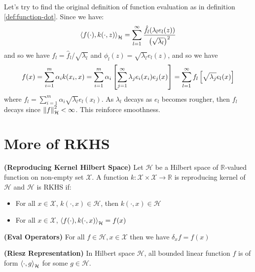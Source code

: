 \begin{remark}
    Let's try to find the original definition of function evaluation as in definition \ref{def:function-dot}. Since we have:
    \begin{equation*}
        \left\langle f(\cdot), k(\cdot, z) \right\rangle_\mathcal{H} = \sum^\infty_{l=1}\frac{\hat{f}_l(\lambda_le_l(z))}{\left( \sqrt{\lambda_l} \right)^2}
    \end{equation*} 
    and so we have $f_l = \hat{f}_l/\sqrt{\lambda_l}$ and $\phi_l(z) = \sqrt{\lambda_l}e_l(z)$, and so we have
    \begin{equation*}
        f(x) = \sum^m_{i=1}\alpha_ik(x_i, x) = \sum^m_{i=1}\alpha_i\left[ \sum^\infty_{j=1}\lambda_je_i(x_i)e_j(x) \right] = \sum^\infty_{l=1}f_l\left[ \sqrt{\lambda_j}e_l(x) \right]
    \end{equation*}
    where $f_l = \sum^m_{i=1}\alpha_i\sqrt{\lambda_l}e_l(x_l)$. As $\lambda_l$ decays as $e_l$ becomes rougher, then $f_l$ decays since $\left\lVert f\right\rVert^2_\mathcal{H}<\infty$. This reinforce smoothness.
\end{remark}

\section{More of RKHS}

\begin{definition}{\textbf{(Reproducing Kernel Hilbert Space)}}
    Let $\mathcal{H}$ be a Hilbert space of $\mathbb{R}$-valued function on non-empty set $\mathcal{X}$. A function $k:\mathcal{X}\times\mathcal{X}\rightarrow \mathbb{R}$ is reproducing kernel of $\mathcal{H}$ and $\mathcal{H}$ is RKHS if:
    \begin{itemize}
        \item For all $x\in\mathcal{X}$, $k(\cdot, x) \in\mathcal{H}$, then $k(\cdot, x)\in\mathcal{H}$
        \item For all $x\in\mathcal{X}$, $\left\langle f(\cdot), k(\cdot,x) \right\rangle_\mathcal{H} = f(x)$
    \end{itemize}
\end{definition}

\begin{definition}{\textbf{(Eval Operators)}}
    For all $f\in\mathcal{H}, x\in\mathcal{X}$ then we have $\delta_x f = f(x)$
\end{definition}

\begin{theorem}{\textbf{(Riesz Representation)}}
    In Hilbert space $\mathcal{H}$, all bounded linear function $f$ is of form $\left\langle \cdot,g \right\rangle_\mathcal{H}$ for some $g\in\mathcal{H}$.
\end{theorem}

